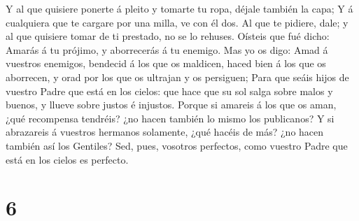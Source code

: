  Y al que quisiere ponerte á pleito y tomarte tu ropa,
déjale también la capa;  Y á cualquiera que te cargare
por una milla, ve con él dos.  Al que te pidiere, dale; y
al que quisiere tomar de ti prestado, no se lo rehuses. 
Oísteis que fué dicho: Amarás á tu prójimo, y aborrecerás á tu enemigo.
 Mas yo os digo: Amad á vuestros enemigos, bendecid á los
que os maldicen, haced bien á los que os aborrecen, y orad por los que
os ultrajan y os persiguen;  Para que seáis hijos de
vuestro Padre que está en los cielos: que hace que su sol salga sobre
malos y buenos, y llueve sobre justos é injustos.  Porque
si amareis á los que os aman, ¿qué recompensa tendréis? ¿no hacen
también lo mismo los publicanos?  Y si abrazareis á
vuestros hermanos solamente, ¿qué hacéis de más? ¿no hacen también así
los Gentiles?  Sed, pues, vosotros perfectos, como
vuestro Padre que está en los cielos es perfecto.

\hypertarget{section-5}{%
\section{6}\label{section-5}}

